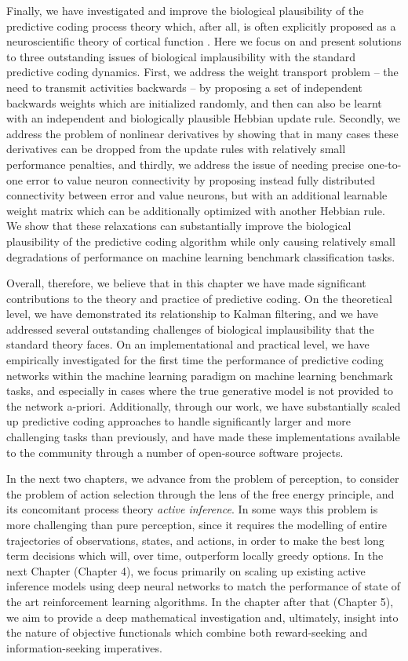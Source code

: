Finally, we have investigated and improve the biological plausibility of the predictive coding process theory which, after all, is often explicitly proposed as a neuroscientific theory of cortical function \citep{friston2003learning,bastos2012canonical}. Here we focus on and present solutions to three outstanding issues of biological implausibility with the standard predictive coding dynamics. First, we address the weight transport problem -- the need to transmit activities backwards -- by proposing a set of independent backwards weights which are initialized randomly, and then can also be learnt with an independent and biologically plausible Hebbian update rule. Secondly, we address the problem of nonlinear derivatives by showing that in many cases these derivatives can be dropped from the update rules with relatively small performance penalties, and thirdly, we address the issue of needing precise one-to-one error to value neuron connectivity by proposing instead fully distributed connectivity between error and value neurons, but with an additional learnable weight matrix which can be additionally optimized with another Hebbian rule. We show that these relaxations can substantially improve the biological plausibility of the predictive coding algorithm while only causing relatively small degradations of performance on machine learning benchmark classification tasks.

Overall, therefore, we believe that in this chapter we have made significant contributions to the theory and practice of predictive coding. On the theoretical level, we have demonstrated its relationship to Kalman filtering, and we have addressed several outstanding challenges of biological implausibility that the standard theory faces. On an implementational and practical level, we have empirically investigated for the first time the performance of predictive coding networks within the machine learning paradigm on machine learning benchmark tasks, and especially in cases where the true generative model is not provided to the network a-priori. Additionally, through our work, we have substantially scaled up predictive coding approaches to handle significantly larger and more challenging tasks than previously, and have made these implementations available to the community through a number of open-source software projects.

In the next two chapters, we advance from the problem of perception, to consider the problem of action selection through the lens of the free energy principle, and its concomitant process theory \emph{active inference}. In some ways this problem is more challenging than pure perception, since it requires the modelling of entire trajectories of observations, states, and actions, in order to make the best long term decisions which will, over time, outperform locally greedy options. In the next Chapter (Chapter 4), we focus primarily on scaling up existing active inference models using deep neural networks to match the performance of state of the art reinforcement learning algorithms. In the chapter after that (Chapter 5), we aim to provide a deep mathematical investigation and, ultimately, insight into the nature of objective functionals which combine both reward-seeking and information-seeking imperatives.